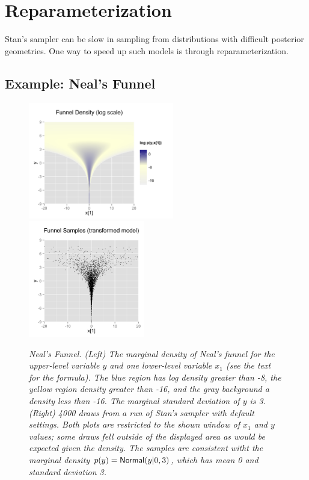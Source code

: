 \section{Reparameterization}

Stan's sampler can be slow in sampling from distributions with
difficult posterior geometries.  One way to speed up such models is
through reparameterization.

\subsection{Example: Neal's Funnel}

\begin{figure}
\vspace*{-6pt}
\begin{center}
\includegraphics[height=2in]{R/funnel.png}
\includegraphics[height=2in]{R/funnel-fit.png}
\end{center}
\vspace*{-18pt}
\caption{\small \it Neal's Funnel.  (Left) The marginal density of
  Neal's funnel for the upper-level variable $y$ and one lower-level
  variable $x_1$ (see the text for the formula).  The blue region has
  log density greater than -8, the yellow region density greater than
  -16, and the gray background a density less than -16.  The marginal
  standard deviation of $y$ is 3.  (Right) 4000 draws from a run of Stan's
  sampler with default settings.  Both plots are restricted to the
  shown window of $x_1$ and $y$ values; some draws fell outside of
  the displayed area as would be expected given the density.  The samples are
  consistent witht the marginal density $p(y) =
  \mbox{\sf Normal}(y|0,3)$, which has mean 0 and standard deviation
  3.}\label{funnel.figure}
\end{figure}

